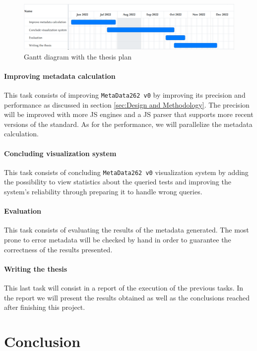 \documentclass[runningheads]{llncs}
\begin{document}
\begin{figure}[ht]
    \centering
    \includegraphics[width=1\textwidth]{images/gantt_thesis_month.png}
    \caption{Gantt diagram with the thesis plan}
    \label{fig:gantt_month}
\end{figure}


\paragraph{Improving metadata calculation}
This task consists of improving \texttt{MetaData262 v0} by improving its precision and performance as discussed in section \ref{sec:Design and Methodology}. The precision will be improved with more JS engines and a JS parser that supports more recent versions of the standard. As for the performance, we will parallelize the metadata calculation.

\paragraph{Concluding visualization system}
This task consists of concluding \texttt{MetaData262 v0} visualization system by adding the possibility to view statistics about the queried tests and improving the system's reliability through preparing it to handle wrong queries.

\paragraph{Evaluation}
This task consists of evaluating the results of the metadata generated. The most prone to error metadata will be checked by hand in order to guarantee the correctness of the results presented.

\paragraph{Writing the thesis}
This last task will consist in a report of the execution of the previous tasks. In the report we will present the results obtained as well as the conclusions reached after finishing this project. 


\section{Conclusion}
\label{sec:Conclusion}


%
%

%
%
%
% 
% 
%


\end{document}
